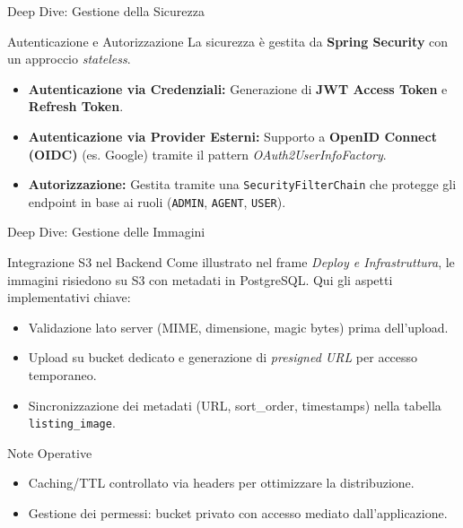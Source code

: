 \documentclass[10pt]{beamer}
\begin{document}
\begin{frame}{Deep Dive: Gestione della Sicurezza}
    \begin{block}{Autenticazione e Autorizzazione}
        La sicurezza è gestita da \textbf{Spring Security} con un approccio \textit{stateless}.
        \begin{itemize}
            \item \textbf{Autenticazione via Credenziali:} Generazione di \textbf{JWT Access Token} e \textbf{Refresh Token}.
            \item \textbf{Autenticazione via Provider Esterni:} Supporto a \textbf{OpenID Connect (OIDC)} (es. Google) tramite il pattern \textit{OAuth2UserInfoFactory}.
            \item \textbf{Autorizzazione:} Gestita tramite una \texttt{SecurityFilterChain} che protegge gli endpoint in base ai ruoli (\texttt{ADMIN}, \texttt{AGENT}, \texttt{USER}).
        \end{itemize}
    \end{block}
\end{frame}

\begin{frame}{Deep Dive: Gestione delle Immagini}
    \begin{block}{Integrazione S3 nel Backend}
        Come illustrato nel frame \textit{Deploy e Infrastruttura}, le immagini risiedono su S3 con metadati in PostgreSQL. Qui gli aspetti implementativi chiave:
        \begin{itemize}
            \item Validazione lato server (MIME, dimensione, magic bytes) prima dell'upload.
            \item Upload su bucket dedicato e generazione di \textit{presigned URL} per accesso temporaneo.
            \item Sincronizzazione dei metadati (URL, sort\_order, timestamps) nella tabella \texttt{listing\_image}.
        \end{itemize}
    \end{block}
    \begin{alertblock}{Note Operative}
        \begin{itemize}
            \item Caching/TTL controllato via headers per ottimizzare la distribuzione.
            \item Gestione dei permessi: bucket privato con accesso mediato dall'applicazione.
        \end{itemize}
    \end{alertblock}
\end{frame}
\end{document}
